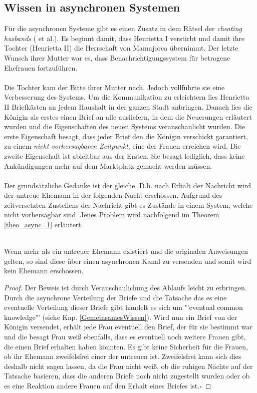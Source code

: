\subsection{Wissen in asynchronen Systemen}
\label{wissen_sync}
Für die asynchronen Systeme gibt es einen Zusatz in dem Rätsel der \textit{cheating husbands} (\cite{moses1986cheating} et al.). Es beginnt damit, dass Henrietta I verstirbt und damit ihre Tochter (Henrietta II) die Herrschaft von Mamajorca übernimmt. Der letzte Wunsch ihrer Mutter war es, dass Benachrichtigungssystem für betrogene Ehefrauen fortzuführen. \\\\
Die Tochter kam der Bitte ihrer Mutter nach. Jedoch vollführte sie eine Verbesserung des Systems. Um die Kommunikation zu erleichtern lies Henrietta II Briefkästen an jedem Haushalt in der ganzen Stadt anbringen. Danach lies die Königin als erstes einen Brief an alle ausliefern, in dem die Neuerungen erläutert wurden und die Eigenschaften des neuen Systems veranschaulicht wurden. Die erste Eigenschaft besagt, dass jeder Brief den die Königin verschickt garantiert, zu einem \textit{nicht vorhersagbaren Zeitpunkt}, eine der Frauen erreichen wird. Die zweite Eigenschaft ist  ableitbar aus der Ersten. Sie besagt lediglich, dass keine Ankündigungen mehr auf dem Marktplatz gemacht werden müssen.\\\\
Der grundsätzliche Gedanke ist der gleiche. D.h. nach Erhalt der Nachricht wird der untreue Ehemann in der folgenden Nacht erschossen. Aufgrund des zeitversetzten Zustellens der Nachricht gibt es Zustände in einem System, welche nicht vorhersagbar sind. Jenes Problem wird nachfolgend im Theorem \ref{theo_async_1} erläutert.
\begin{theorem}\\
\label{theo_async_1}
Wenn mehr als ein untreuer Ehemann existiert und die originalen Anweisungen gelten, so sind diese über einen asynchronen Kanal zu versenden und somit wird kein Ehemann erschossen.
\end{theorem}
\begin{proof}
Der Beweis ist durch Veranschaulichung des Ablaufs leicht zu erbringen. Durch die asynchrone Verteilung der Briefe und die Tatsache das es eine eventuelle Verteilung dieser Briefe gibt handelt es sich um "'eventual common knowledge"' (siehe Kap. \ref{GemeinsamesWissen}). Wird nun ein Brief von der Königin versendet, erhält jede Frau eventuell den Brief, der für sie bestimmt war und die besagt Frau weiß ebenfalls, dass es eventuell noch weitere Frauen gibt, die einen Brief erhalten haben könnten. Es gibt keine Sicherheit für die Frauen, ob ihr Ehemann zweifelsfrei einer der untreuen ist. Zweifelsfrei kann sich dies deshalb nicht sagen lassen, da die Frau nicht weiß, ob die ruhigen Nächte auf der Tatsache basieren, dass die anderen Briefe noch nicht zugestellt wurden oder ob es eine Reaktion andere Frauen auf den Erhalt eines Briefes ist.$\square$
\end{proof}
